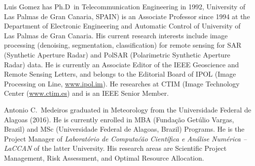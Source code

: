 \documentclass[journal,twoside]{IEEEtran}
\begin{document}
\begin{IEEEbiography}{Luis Gomez} has Ph.D\ in Telecommunication Engineering in 1992, University of Las Palmas de Gran Canaria, SPAIN) is an Associate Professor since 1994 at the Department of Electronic Engineering and Automatic Control of University of Las Palmas de Gran Canaria. 
His current research interests include image processing (denoising, segmentation, classification) for remote sensing for SAR (Synthetic Aperture Radar) and PolSAR (Polarimetric Synthetic Aperture Radar) data. 
He is currently an Associate Editor of the IEEE Geoscience and Remote Sensing Letters, and belongs to the Editorial Board of IPOL (Image Processing on Line, \url{www.ipol.im}). 
He researches at CTIM (Image Technology Center (\url{www.ctim.es}) and is an IEEE Senior Member.
\end{IEEEbiography}

\begin{IEEEbiography}{Antonio C.\ Medeiros} graduated in Meteorology from the Universidade Federal de Alagoas (2016).
He is currently enrolled in 
MBA (Funda\c c\~ao Get\'ulio Vargas, Brazil) and
MSc (Universidade Federal de Alagoas, Brazil) Programs.
He is the Project Manager of \textit{Laborat\'orio de Computa\'c\~ao Cient\'ifica e An\'alise Num\'erica -- LaCCAN} of the latter University.
His research areas are Scientific Project Management, Risk Assessment, and Optimal Resource Allocation.
\end{IEEEbiography}
\end{document}
